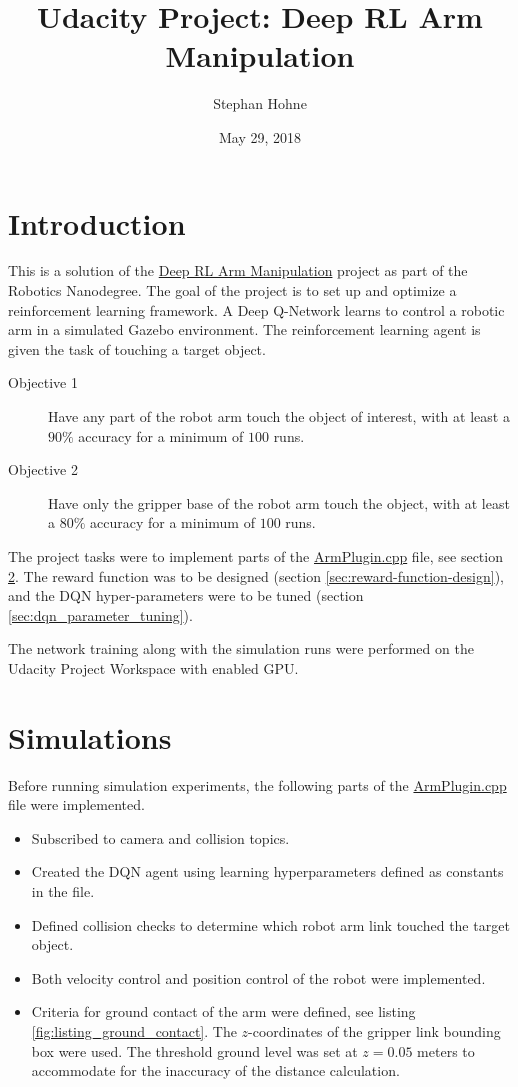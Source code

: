\documentclass[11pt, onecolumn, oneside, reqno]{amsart}
\title{Udacity Project: Deep RL Arm Manipulation}
\author{Stephan Hohne}
\date{May 29, 2018}
\begin{document}
\maketitle

\section{Introduction}
This is a solution of the \href{https://github.com/udacity/RoboND-DeepRL-Project}{Deep RL Arm Manipulation} project as part of the Robotics Nanodegree. The goal of the project is to set up and optimize a reinforcement learning framework. A Deep Q-Network learns to control a robotic arm in a simulated Gazebo environment. The reinforcement learning agent is given the task of touching a target object.
\begin{description}
\item[Objective 1] Have any part of the robot arm touch the object of interest, with at least a $90\%$ accuracy for a minimum of $100$ runs.
\item[Objective 2] Have only the gripper base of the robot arm touch the object, with at least a $80\%$ accuracy for a minimum of $100$ runs.
\end{description}

The project tasks were to implement parts of the \href{https://github.com/S2H-Mobile/RoboND-DeepRL-Project-Solution/blob/develop/gazebo/ArmPlugin.cpp}{ArmPlugin.cpp} file, see section \ref{sec:simulations}. The reward function was to be designed (section \ref{sec:reward-function-design}), and the DQN hyper-parameters were to be tuned (section \ref{sec:dqn_parameter_tuning}).

The network training along with the simulation runs were performed on the Udacity Project Workspace with enabled GPU.
 
\section{Simulations}
\label{sec:simulations}
Before running simulation experiments, the following parts of the \href{https://github.com/S2H-Mobile/RoboND-DeepRL-Project-Solution/blob/develop/gazebo/ArmPlugin.cpp}{ArmPlugin.cpp} file were implemented.
\begin{itemize}
\item Subscribed to camera and collision topics.
\item Created the DQN agent using learning hyperparameters defined as constants in the file.
\item Defined collision checks to determine which robot arm link touched the target object.
\item Both velocity control and position control of the robot were implemented.
\item Criteria for ground contact of the arm were defined, see listing \ref{fig:listing_ground_contact}. The $z$-coordinates of the gripper link bounding box were used. The threshold ground level was set at $z=0.05$ meters to accommodate for the inaccuracy of the distance calculation.
\end{itemize}
\end{document}
